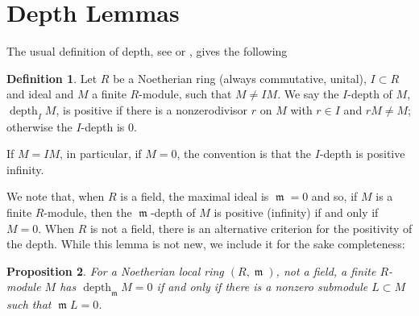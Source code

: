 \documentclass{amsart}
\numberwithin{equation}{section}
\theoremstyle{definition}
\newtheorem{definition}{Definition}[section]
\theoremstyle{plain}
\newtheorem{proposition}[definition]{Proposition}
\theoremstyle{remark}
\begin{document}
\section{Depth  Lemmas}
The usual definition of depth, see \cite[pp. 423,429]{eisen} or 
\cite[p.  130]{matsumura}, 
gives the following 
\begin{definition}\label{defn_depth}
Let $R$ be a Noetherian ring (always commutative, unital), $I\subset R$
and ideal and $M$ a finite $R$-module, such that $M\not=IM$. 
We say the $I$-depth 
of $M$, ${\mathop{\mathrm{depth}}\nolimits _{{I}}} M$, is positive if there is 
a nonzerodivisor $r$ on $M$ with $r\in I$ and $rM\not=M$;
otherwise the $I$-depth is $0$.

If $M=IM$, in particular, if $M=0$, the convention is that the $I$-depth is positive infinity.
\end{definition}
We note that, when $R$ is a field, the maximal ideal is ${{\mathop{\mathfrak{m}}}}=0$  and so,
if $M$ is a finite $R$-module, then
the ${{\mathop{\mathfrak{m}}}}$-depth 
 of $M$ is positive (infinity) if and
only if $M=0$.
When $R$ is  not a field, there is 
an alternative criterion for the positivity of the depth. 
While this lemma is not new, 
we include it for the sake completeness:
\begin{proposition}\label{prop_depth_lemmas_depth_better}
For a Noetherian local ring $(R,{{\mathop{\mathfrak{m}}}})$, not a field, a finite $R$-module $M$ 
has 
${\mathop{\mathrm{depth}}\nolimits _{{\mathop{\mathfrak{m}}}}} M=0$ if and only  if there is a nonzero submodule 
$L\subset M$ such that ${{\mathop{\mathfrak{m}}}} L=0$.
\end{proposition}
\end{document}

